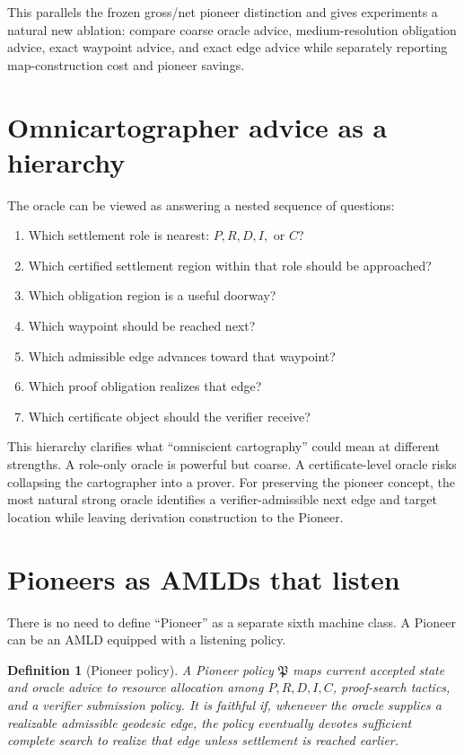 \documentclass[11pt]{article}
\newtheorem{definition}{Definition}[section]
\theoremstyle{remark}
\begin{document}
This parallels the frozen gross/net pioneer distinction and gives experiments a natural new ablation: compare coarse oracle advice, medium-resolution obligation advice, exact waypoint advice, and exact edge advice while separately reporting map-construction cost and pioneer savings.

\section{Omnicartographer advice as a hierarchy}

The oracle can be viewed as answering a nested sequence of questions:
\begin{enumerate}[label=\textbf{Level \arabic*:}, leftmargin=2.1cm]
\item Which settlement role is nearest: $P,R,D,I,$ or $C$?
\item Which certified settlement region within that role should be approached?
\item Which obligation region is a useful doorway?
\item Which waypoint should be reached next?
\item Which admissible edge advances toward that waypoint?
\item Which proof obligation realizes that edge?
\item Which certificate object should the verifier receive?
\end{enumerate}
This hierarchy clarifies what ``omniscient cartography'' could mean at different strengths. A role-only oracle is powerful but coarse. A certificate-level oracle risks collapsing the cartographer into a prover. For preserving the pioneer concept, the most natural strong oracle identifies a verifier-admissible next edge and target location while leaving derivation construction to the Pioneer.

\section{Pioneers as AMLDs that listen}

There is no need to define ``Pioneer'' as a separate sixth machine class. A Pioneer can be an AMLD equipped with a listening policy.

\begin{definition}[Pioneer policy]
A Pioneer policy $\mathfrak P$ maps current accepted state and oracle advice to resource allocation among $P,R,D,I,C$, proof-search tactics, and a verifier submission policy. It is \emph{faithful} if, whenever the oracle supplies a realizable admissible geodesic edge, the policy eventually devotes sufficient complete search to realize that edge unless settlement is reached earlier.
\end{definition}
\end{document}
